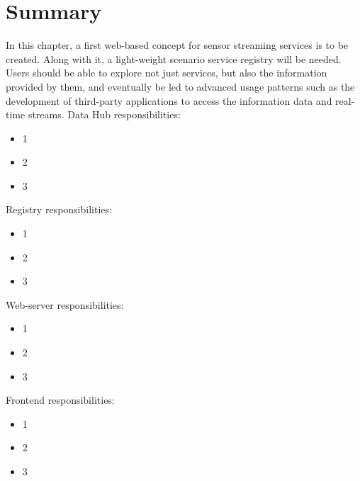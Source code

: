 \section{Summary}
	In this chapter, a first web-based concept for sensor streaming services is to be created. Along with it, a light-weight scenario service registry will be needed. Users should be able to explore not just services, but also the information provided by them, and eventually be led to advanced usage patterns such as the development of third-party applications to access the information data and real-time streams.
  \newline
  Data Hub responsibilities:
  \begin{itemize}
  \item 1
  \item 2
  \item 3
  \end{itemize}
  Registry responsibilities:
  \begin{itemize}
  \item 1
  \item 2
  \item 3
  \end{itemize}
  Web-server responsibilities:
  \begin{itemize}
  \item 1
  \item 2
  \item 3
  \end{itemize}
  Frontend responsibilities:
  \begin{itemize}
  \item 1
  \item 2
  \item 3
  \end{itemize}